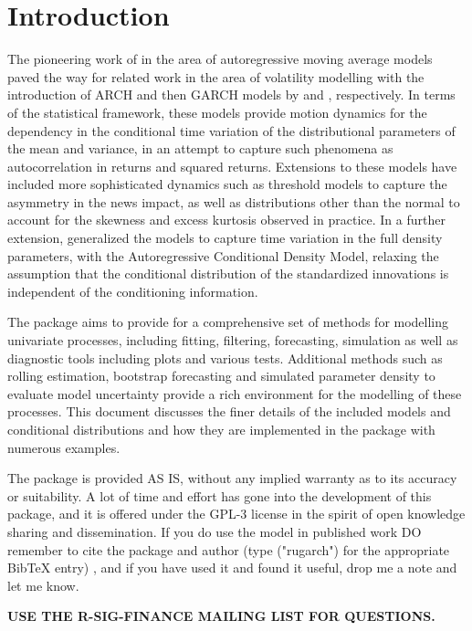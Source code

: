 \section{Introduction}
The pioneering work of \cite{Box1994} in the area of autoregressive moving
average models paved the way for related work in the area of volatility
modelling with the introduction of ARCH and then GARCH models by \cite{Engle1982}
and \cite{Bollerslev1986}, respectively. In terms of the statistical framework,
these models provide motion dynamics for the dependency in the conditional
time variation of the distributional parameters of the mean and variance, in an
attempt to capture such phenomena as autocorrelation in returns and squared
returns. Extensions to these models have included more sophisticated dynamics
such as threshold models to capture the asymmetry in the news impact, as well
as distributions other than the normal to account for the skewness and excess
kurtosis observed in practice. In a further extension, \cite{Hansen1994}
generalized the \verb@GARCH@ models to capture time variation in the full density
parameters, with the Autoregressive Conditional Density Model, relaxing the assumption that the
conditional distribution of the standardized innovations is independent of the
conditioning information.

The \verb@rugarch@ package aims to provide for a comprehensive set of methods
for modelling univariate \verb@GARCH@ processes, including fitting, filtering,
forecasting, simulation as well as diagnostic tools including plots and various
tests. Additional methods such as rolling estimation, bootstrap forecasting and
simulated parameter density to evaluate model uncertainty provide a rich
environment for the modelling of these processes. This document discusses the
finer details of the included models and conditional distributions and
how they are implemented in the package with numerous examples.


The package is provided AS IS, without any implied warranty as to its accuracy
or suitability. A lot of time and effort has gone into the development of this
package, and it is offered under the GPL-3 license in the spirit of open
knowledge sharing and dissemination. If you do use the model in published work
DO remember to cite the package and author (type \verb@citation@("rugarch") for
the appropriate BibTeX entry) , and if you have used it and found it
useful, drop me a note and let me know.

\textbf{USE THE R-SIG-FINANCE MAILING LIST FOR QUESTIONS.}

